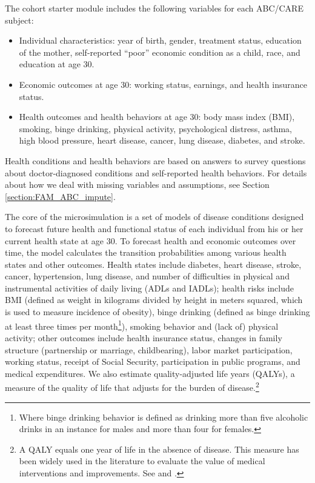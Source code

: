 \noindent The cohort starter module includes the following variables for each ABC/CARE subject:

\begin{itemize}
\item Individual characteristics: year of birth, gender, treatment status, education of the mother, self-reported ``poor'' economic condition as a child, race, and education at age 30.
\item Economic outcomes at age 30: working status, earnings, and health insurance status.
\item Health outcomes and health behaviors at age 30: body mass index (BMI), smoking, binge drinking, physical activity, psychological distress, asthma, high blood pressure, heart disease, cancer, lung disease, diabetes, and stroke.
\end{itemize}

\noindent Health conditions and health behaviors are based on answers to survey questions about doctor-diagnosed conditions and self-reported health behaviors. For details about how we deal with missing variables and assumptions, see Section \ref{section:FAM_ABC_impute}. %

\noindent The core of the microsimulation is a set of models of disease conditions designed to forecast future health and functional status of each individual from his or her current health state at age 30. To forecast health and economic outcomes over time, the model calculates the transition probabilities among various health states and other outcomes. Health states include diabetes, heart disease, stroke, cancer, hypertension, lung disease, and number of difficulties in physical and instrumental activities of daily living (ADLs and IADLs); health risks include BMI (defined as weight in kilograms divided by height in meters squared, which is used to measure incidence of obesity), binge drinking (defined as binge drinking at least three times per month\footnote{Where binge drinking behavior is defined as drinking more than five alcoholic drinks in an instance for males and more than four for females.}), smoking behavior and (lack of) physical activity; other outcomes include health insurance status, changes in family structure (partnership or marriage, childbearing), labor market participation, working status, receipt of Social Security, participation in public programs, and medical expenditures. We also estimate quality-adjusted life years (QALYs), a measure of the quality of life that adjusts for the burden of disease.\footnote{A QALY equals one year of life in the absence of disease. This measure has been widely used in the literature to evaluate the value of medical interventions and improvements. See \cite{Dolan_1997_Modeling_MC} and \cite{Shaw_etal_2005_EQ5D_MC}.}

